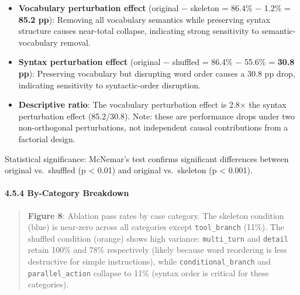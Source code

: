 \begin{itemize}

\tightlist

\item

  \textbf{Vocabulary perturbation effect} (original − skeleton = 86.4\% − 1.2\% = \textbf{85.2 pp}): Removing all vocabulary semantics while preserving syntax structure causes near-total collapse, indicating strong sensitivity to semantic-vocabulary removal.

\item

  \textbf{Syntax perturbation effect} (original − shuffled = 86.4\% − 55.6\% = \textbf{30.8 pp}): Preserving vocabulary but disrupting word order causes a 30.8 pp drop, indicating sensitivity to syntactic-order disruption.

\item

  \textbf{Descriptive ratio}: The vocabulary perturbation effect is 2.8× the syntax perturbation effect (85.2/30.8). Note: these are performance drops under two non-orthogonal perturbations, not independent causal contributions from a factorial design.

\end{itemize}



Statistical significance: McNemar's test confirms significant differences between original vs.~shuffled (p \textless{} 0.01) and original vs.~skeleton (p \textless{} 0.001).



\paragraph{4.5.4 By-Category Breakdown}\label{by-category-breakdown}



\begin{quote}

\textbf{Figure 8}: Ablation pass rates by case category. The skeleton condition (blue) is near-zero across all categories except \texttt{tool\_branch} (11\%). The shuffled condition (orange) shows high variance: \texttt{multi\_turn} and \texttt{detail} retain 100\% and 78\% respectively (likely because word reordering is less destructive for simple instructions), while \texttt{conditional\_branch} and \texttt{parallel\_action} collapse to 11\% (syntax order is critical for these categories).

\end{quote}



